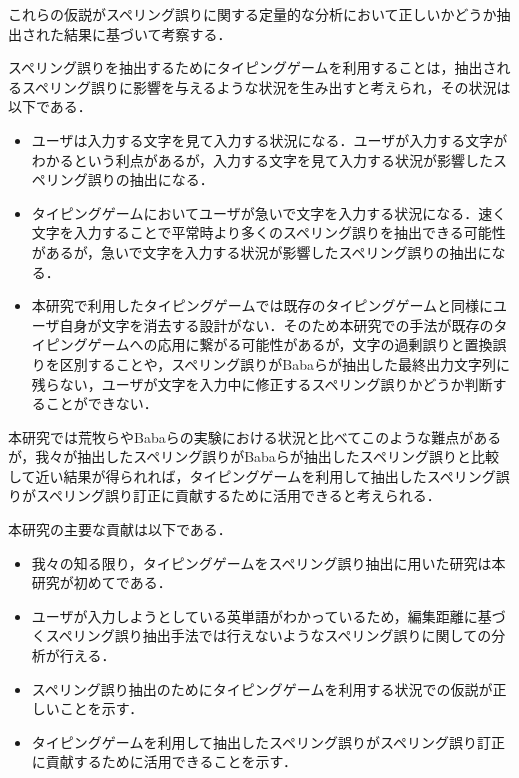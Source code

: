 これらの仮説がスペリング誤りに関する定量的な分析において正しいかどうか抽出された結果に基づいて考察する．

スペリング誤りを抽出するためにタイピングゲームを利用することは，抽出されるスペリング誤りに影響を与えるような状況を生み出すと考えられ，その状況は以下である．

\begin{itemize}
 \item ユーザは入力する文字を見て入力する状況になる．ユーザが入力する文字がわかるという利点があるが，入力する文字を見て入力する状況が影響したスペリング誤りの抽出になる．
 \item タイピングゲームにおいてユーザが急いで文字を入力する状況になる．速く文字を入力することで平常時より多くのスペリング誤りを抽出できる可能性があるが，急いで文字を入力する状況が影響したスペリング誤りの抽出になる．
 \item 本研究で利用したタイピングゲームでは既存のタイピングゲーム\cite{game}と同様にユーザ自身が文字を消去する設計がない．そのため本研究での手法が既存のタイピングゲームへの応用に繋がる可能性があるが，文字の過剰誤りと置換誤りを区別することや，スペリング誤りがBabaらが抽出した最終出力文字列に残らない，ユーザが文字を入力中に修正するスペリング誤り\cite{babaACL2012}かどうか判断することができない．
\end{itemize}

本研究では荒牧ら\cite{aramakiNLP2010}やBabaら\cite{babaACL2012}の実験における状況と比べてこのような難点があるが，我々が抽出したスペリング誤りがBabaらが抽出したスペリング誤りと比較して近い結果が得られれば，タイピングゲームを利用して抽出したスペリング誤りがスペリング誤り訂正に貢献するために活用できると考えられる．

本研究の主要な貢献は以下である．

\begin{itemize}
 \item 我々の知る限り，タイピングゲームをスペリング誤り抽出に用いた研究は本研究が初めてである．
 \item ユーザが入力しようとしている英単語がわかっているため，編集距離に基づくスペリング誤り抽出手法\cite{aramakiNLP2010}では行えないようなスペリング誤りに関しての分析が行える．
 \item スペリング誤り抽出のためにタイピングゲームを利用する状況での仮説が正しいことを示す．
 \item タイピングゲームを利用して抽出したスペリング誤りがスペリング誤り訂正に貢献するために活用できることを示す．
\end{itemize}
